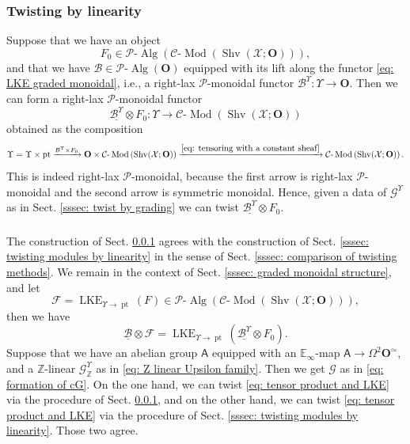 \documentclass[10pt]{amsart}
\newcommand{\sssec}{\subsubsection}
\theoremstyle{remark}
\newcommand{\ul}{\underline}
\newcommand{\E}{\mathbb{E}}
\newcommand{\Z}{\mathbb{Z}}
\newcommand{\cP}{\mathcal{P}}
\newcommand{\on}{\operatorname}
\newcommand{\cB}{\mathcal{B}}
\newcommand{\cC}{\mathcal{C}}
\newcommand{\cF}{\mathcal{F}}
\newcommand{\cG}{\mathcal{G}}
\newcommand{\cX}{\mathcal{X}}
\newcommand{\lMod}{\text{-}\on{Mod}}
\newcommand{\lAlg}{\text{-}\on{Alg}}
\newcommand{\Shv}{\on{Shv}}
\newcommand{\bO}{\mathbf{O}}
\newcommand{\pt}{\on{pt}}
\newcommand{\sfA}{\mathsf{A}}
\begin{document}
\sssec{Twisting by linearity}\label{sssec: twisting graded algebras by linearity}
Suppose that we have an object
\[F_0\in\cP\lAlg\left(\cC\lMod\left(\Shv(\cX;\bO)\right)\right),\]
and that we have $\cB\in\cP\lAlg(\bO)$ equipped with its lift along the functor \eqref{eq: LKE graded monoidal}, i.e., a right-lax $\cP$-monoidal functor $\cB^{\Upsilon}:\Upsilon\rightarrow \bO$. Then we can form a right-lax $\cP$-monoidal functor
\[\ul{\cB^{\Upsilon}}\otimes F_0:\Upsilon\rightarrow \cC\lMod\left(\Shv(\cX;\bO)\right)\]
obtained as the composition
\[\Upsilon=\Upsilon\times\pt\xrightarrow{\cB^{\Upsilon} \times  F_0} \bO\times \cC\lMod\left(\Shv(\cX;\bO)\right)\xrightarrow{\eqref{eq: tensoring with a constant sheaf}}\cC\lMod\left(\Shv(\cX;\bO)\right).\]
This is indeed right-lax $\cP$-monoidal, because the first arrow is right-lax $\cP$-monoidal and the second arrow is symmetric monoidal. Hence, given a data of $\cG^{\Upsilon}$ as in Sect. \ref{sssec: twist by grading} we can twist $\ul{\cB^{\Upsilon}}\otimes F_0$.

\sssec{}\label{sssec: comparison twisting by linearity}
The construction of Sect. \ref{sssec: twisting graded algebras by linearity} agrees with the construction of Sect. \ref{sssec: twisting modules by linearity} in the sense of Sect. \ref{sssec: comparison of twisting methods}. We remain in the context of Sect. \ref{sssec: graded monoidal structure}, and let
\[\cF= \on{LKE}_{\Upsilon\rightarrow\pt}(F)\in\cP\lAlg\left(\cC\lMod\left(\Shv(\cX;\bO)\right)\right),\]
then we have
\begin{equation}\label{eq: tensor product and LKE}
    \ul{\cB}\otimes\cF= \on{LKE}_{\Upsilon\rightarrow\pt}(\ul{\cB^{\Upsilon}}\otimes F_0).
\end{equation}
Suppose that we have an abelian group $\sfA$ equipped with an $\E_{\infty}$-map $\sfA\rightarrow\Omega^2\bO^{\simeq}$, and a $\Z$-linear $\cG^{\Upsilon}_{\Z}$ as in \eqref{eq: Z linear Upsilon family}. Then we get $\cG$ as in \eqref{eq: formation of cG}. On the one hand, we can twist \eqref{eq: tensor product and LKE} via the procedure of Sect. \ref{sssec: twisting graded algebras by linearity}, and on the other hand, we can twist \eqref{eq: tensor product and LKE} via the procedure of Sect. \ref{sssec: twisting modules by linearity}. Those two agree.
\end{document}
